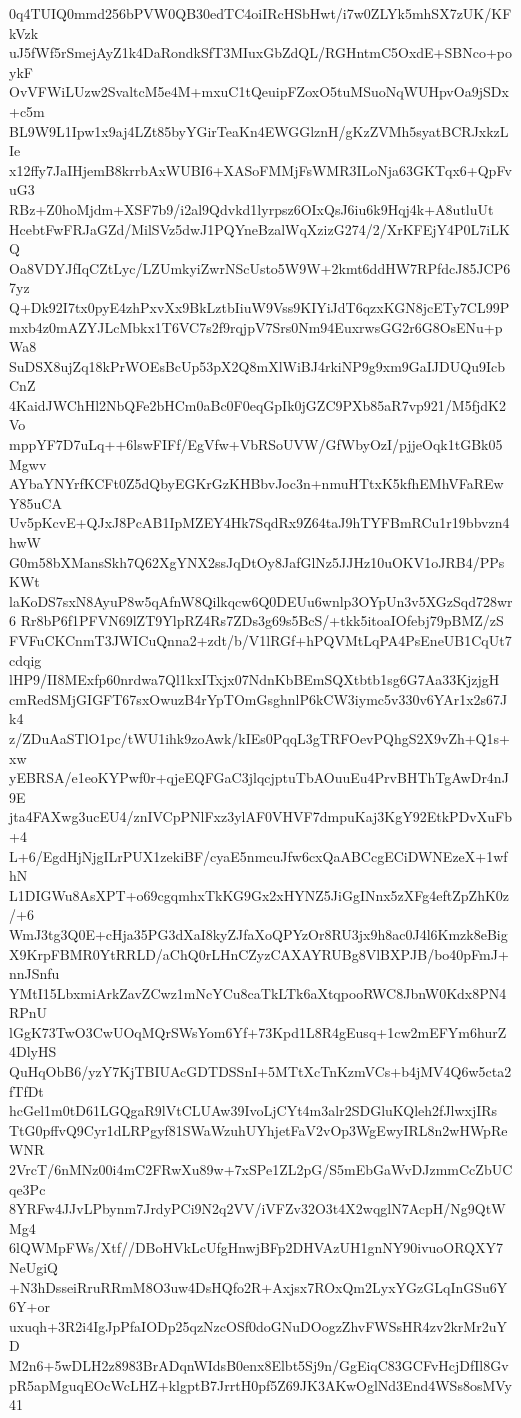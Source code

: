 0q4TUIQ0mmd256bPVW0QB30edTC4oiIRcHSbHwt/i7w0ZLYk5mhSX7zUK/KFkVzk
uJ5fWf5rSmejAyZ1k4DaRondkSfT3MIuxGbZdQL/RGHntmC5OxdE+SBNco+poykF
OvVFWiLUzw2SvaltcM5e4M+mxuC1tQeuipFZoxO5tuMSuoNqWUHpvOa9jSDx+c5m
BL9W9L1Ipw1x9aj4LZt85byYGirTeaKn4EWGGlznH/gKzZVMh5syatBCRJxkzLIe
x12ffy7JaIHjemB8krrbAxWUBI6+XASoFMMjFsWMR3ILoNja63GKTqx6+QpFvuG3
RBz+Z0hoMjdm+XSF7b9/i2al9Qdvkd1lyrpsz6OIxQsJ6iu6k9Hqj4k+A8utluUt
HcebtFwFRJaGZd/MilSVz5dwJ1PQYneBzalWqXzizG274/2/XrKFEjY4P0L7iLKQ
Oa8VDYJfIqCZtLyc/LZUmkyiZwrNScUsto5W9W+2kmt6ddHW7RPfdcJ85JCP67yz
Q+Dk92I7tx0pyE4zhPxvXx9BkLztbIiuW9Vss9KIYiJdT6qzxKGN8jcETy7CL99P
mxb4z0mAZYJLcMbkx1T6VC7s2f9rqjpV7Srs0Nm94EuxrwsGG2r6G8OsENu+pWa8
SuDSX8ujZq18kPrWOEsBcUp53pX2Q8mXlWiBJ4rkiNP9g9xm9GaIJDUQu9IcbCnZ
4KaidJWChHl2NbQFe2bHCm0aBc0F0eqGpIk0jGZC9PXb85aR7vp921/M5fjdK2Vo
mppYF7D7uLq++6lswFIFf/EgVfw+VbRSoUVW/GfWbyOzI/pjjeOqk1tGBk05Mgwv
AYbaYNYrfKCFt0Z5dQbyEGKrGzKHBbvJoc3n+nmuHTtxK5kfhEMhVFaREwY85uCA
Uv5pKcvE+QJxJ8PcAB1IpMZEY4Hk7SqdRx9Z64taJ9hTYFBmRCu1r19bbvzn4hwW
G0m58bXMansSkh7Q62XgYNX2ssJqDtOy8JafGlNz5JJHz10uOKV1oJRB4/PPsKWt
laKoDS7sxN8AyuP8w5qAfnW8Qilkqcw6Q0DEUu6wnlp3OYpUn3v5XGzSqd728wr6
Rr8bP6f1PFVN69lZT9YlpRZ4Rs7ZDs3g69s5BcS/+tkk5itoaIOfebj79pBMZ/zS
FVFuCKCnmT3JWICuQnna2+zdt/b/V1lRGf+hPQVMtLqPA4PsEneUB1CqUt7cdqig
lHP9/II8MExfp60nrdwa7Ql1kxITxjx07NdnKbBEmSQXtbtb1sg6G7Aa33KjzjgH
cmRedSMjGIGFT67sxOwuzB4rYpTOmGsghnlP6kCW3iymc5v330v6YAr1x2s67Jk4
z/ZDuAaSTlO1pc/tWU1ihk9zoAwk/kIEs0PqqL3gTRFOevPQhgS2X9vZh+Q1s+xw
yEBRSA/e1eoKYPwf0r+qjeEQFGaC3jlqcjptuTbAOuuEu4PrvBHThTgAwDr4nJ9E
jta4FAXwg3ucEU4/znIVCpPNlFxz3ylAF0VHVF7dmpuKaj3KgY92EtkPDvXuFb+4
L+6/EgdHjNjgILrPUX1zekiBF/cyaE5nmcuJfw6cxQaABCcgECiDWNEzeX+1wfhN
L1DIGWu8AsXPT+o69cgqmhxTkKG9Gx2xHYNZ5JiGgINnx5zXFg4eftZpZhK0z/+6
WmJ3tg3Q0E+cHja35PG3dXaI8kyZJfaXoQPYzOr8RU3jx9h8ac0J4l6Kmzk8eBig
X9KrpFBMR0YtRRLD/aChQ0rLHnCZyzCAXAYRUBg8VlBXPJB/bo40pFmJ+nnJSnfu
YMtI15LbxmiArkZavZCwz1mNcYCu8caTkLTk6aXtqpooRWC8JbnW0Kdx8PN4RPnU
lGgK73TwO3CwUOqMQrSWsYom6Yf+73Kpd1L8R4gEusq+1cw2mEFYm6hurZ4DlyHS
QuHqObB6/yzY7KjTBIUAcGDTDSSnI+5MTtXcTnKzmVCs+b4jMV4Q6w5cta2fTfDt
hcGel1m0tD61LGQgaR9lVtCLUAw39IvoLjCYt4m3alr2SDGluKQleh2fJlwxjIRs
TtG0pffvQ9Cyr1dLRPgyf81SWaWzuhUYhjetFaV2vOp3WgEwyIRL8n2wHWpReWNR
2VrcT/6nMNz00i4mC2FRwXu89w+7xSPe1ZL2pG/S5mEbGaWvDJzmmCcZbUCqe3Pc
8YRFw4JJvLPbynm7JrdyPCi9N2q2VV/iVFZv32O3t4X2wqglN7AcpH/Ng9QtWMg4
6lQWMpFWs/Xtf//DBoHVkLcUfgHnwjBFp2DHVAzUH1gnNY90ivuoORQXY7NeUgiQ
+N3hDsseiRruRRmM8O3uw4DsHQfo2R+Axjsx7ROxQm2LyxYGzGLqInGSu6Y6Y+or
uxuqh+3R2i4IgJpPfaIODp25qzNzcOSf0doGNuDOogzZhvFWSsHR4zv2krMr2uYD
M2n6+5wDLH2z8983BrADqnWIdsB0enx8Elbt5Sj9n/GgEiqC83GCFvHcjDfIl8Gv
pR5apMguqEOcWcLHZ+klgptB7JrrtH0pf5Z69JK3AKwOglNd3End4WSs8osMVy41
